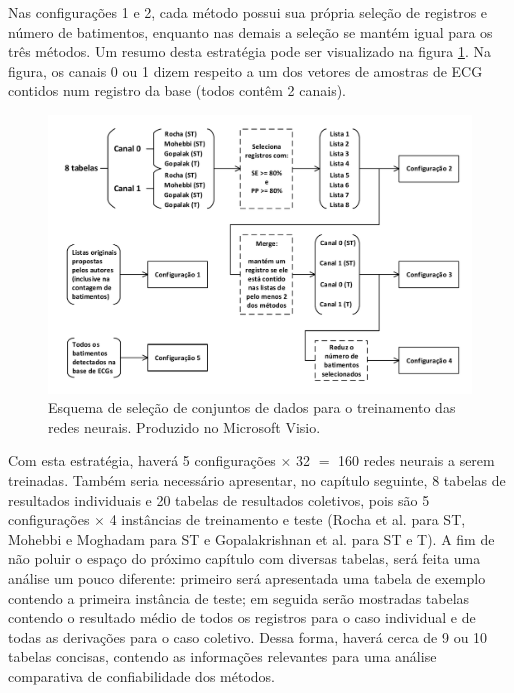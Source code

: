 Nas configurações 1 e 2, cada método possui sua própria seleção de registros e número de batimentos, enquanto nas demais a seleção se mantém igual para os três métodos. Um resumo desta estratégia pode ser visualizado na figura \ref{fig:selection}. Na figura, os canais 0 ou 1 dizem respeito a um dos vetores de amostras de ECG contidos num registro da base (todos contêm 2 canais).

\begin{figure}[ht]
    \centering
    \includegraphics[width=470pt]{figures/chap6-selection-scheme.pdf}
    \caption[Esquema de seleção de conjuntos de dados]{Esquema de seleção de conjuntos de dados para o treinamento das redes neurais. Produzido no Microsoft Visio.}
    \label{fig:selection}
\end{figure}

Com esta estratégia, haverá 5 configurações $\times$ 32 $=$ 160 redes neurais a serem treinadas. Também seria necessário apresentar, no capítulo seguinte, 8 tabelas de resultados individuais e 20 tabelas de resultados coletivos, pois são 5 configurações $\times$ 4 instâncias de treinamento e teste (Rocha et al. para ST, Mohebbi e Moghadam para ST e Gopalakrishnan et al. para ST e T). A fim de não poluir o espaço do próximo capítulo com diversas tabelas, será feita uma análise um pouco diferente: primeiro será apresentada uma tabela de exemplo contendo a primeira instância de teste; em seguida serão mostradas tabelas contendo o resultado médio de todos os registros para o caso individual e de todas as derivações para o caso coletivo. Dessa forma, haverá cerca de 9 ou 10 tabelas concisas, contendo as informações relevantes para uma análise comparativa de confiabilidade dos métodos.

